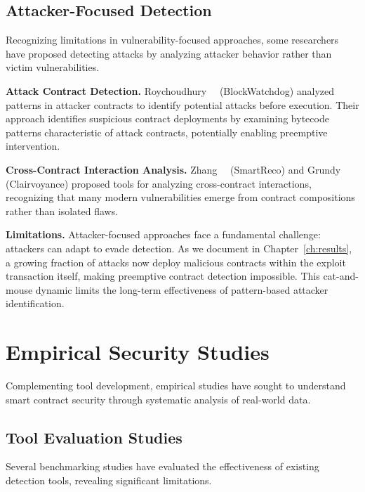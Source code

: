 \subsection{Attacker-Focused Detection}
\label{sec:rw-attacker}

Recognizing limitations in vulnerability-focused approaches, some researchers have proposed detecting attacks by analyzing attacker behavior rather than victim vulnerabilities.

\textbf{Attack Contract Detection.} Roychoudhury~\etal~\cite{attack-contract-detection} (BlockWatchdog) analyzed patterns in attacker contracts to identify potential attacks before execution. Their approach identifies suspicious contract deployments by examining bytecode patterns characteristic of attack contracts, potentially enabling preemptive intervention.

\textbf{Cross-Contract Interaction Analysis.} Zhang~\etal~\cite{smartreco} (SmartReco) and Grundy~\etal~\cite{clairvoyance} (Clairvoyance) proposed tools for analyzing cross-contract interactions, recognizing that many modern vulnerabilities emerge from contract compositions rather than isolated flaws.

\textbf{Limitations.} Attacker-focused approaches face a fundamental challenge: attackers can adapt to evade detection. As we document in Chapter~\ref{ch:results}, a growing fraction of attacks now deploy malicious contracts within the exploit transaction itself, making preemptive contract detection impossible. This cat-and-mouse dynamic limits the long-term effectiveness of pattern-based attacker identification.

\section{Empirical Security Studies}
\label{sec:rw-empirical}

Complementing tool development, empirical studies have sought to understand smart contract security through systematic analysis of real-world data.

\subsection{Tool Evaluation Studies}

Several benchmarking studies have evaluated the effectiveness of existing detection tools, revealing significant limitations.

